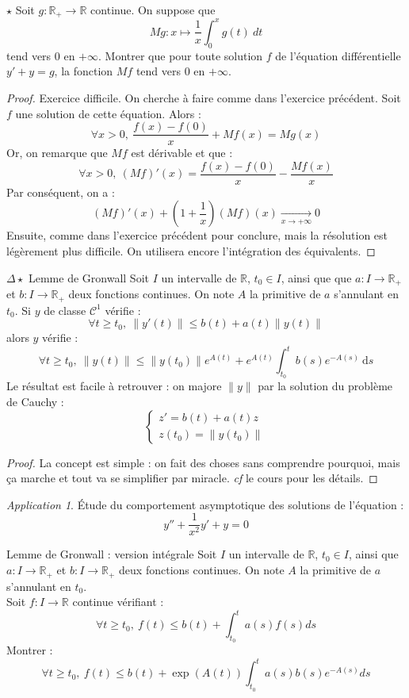 \documentclass[french,a4paper]{article}
\newcommand{\R}{\mathbb{R}}
\theoremstyle{plain}
\theoremstyle{definition}
\theoremstyle{remark}
\newtheorem*{app}{Application}
\begin{document}
\begin{ex}[Moulin.ED.31]{$\star$}
	Soit $g:\R_+\to\R$ continue. On suppose que $$Mg:x\mapsto\frac{1}{x}\int_{0}^{x}g(t)\ dt$$ tend vers $0$ en $+\infty$. Montrer que pour toute solution $f$ de l'équation différentielle $y'+y=g$, la fonction $Mf$ tend vers $0$ en $+\infty$.
\end{ex}
\begin{proof}
	Exercice difficile. On cherche à faire comme dans l'exercice précédent. Soit $f$ une solution de cette équation. Alors : $$\forall x>0,\ \frac{f(x)-f(0)}{x}+Mf(x)=Mg(x)$$ Or, on remarque que $Mf$ est dérivable et que : $$\forall x>0,\ (Mf)'(x)=\frac{f(x)-f(0)}{x}-\frac{Mf(x)}{x}$$ Par conséquent, on a : $$(Mf)'(x)+\left(1+\frac{1}{x}\right)(Mf)(x)\xrightarrow[x\to+\infty]{}0$$ Ensuite, comme dans l'exercice précédent pour conclure, mais la résolution est légèrement plus difficile. On utilisera encore l'intégration des équivalents.
\end{proof}

\begin{ex}{$\Delta\star$ Lemme de Gronwall}
	Soit $I$ un intervalle de $\R$, $t_0\in I$, ainsi que que $a:I\to\R_+$ et $b:I\to\R_+$ deux fonctions continues. On note $A$ la primitive de $a$ s'annulant en $t_0$. Si $y$ de classe $\mathcal{C}^1$ vérifie : $$\forall t\geqslant t_0,\ \lVert y'(t)\rVert\leqslant b(t)+a(t)\lVert y(t)\rVert$$ alors $y$ vérifie : $$\forall t\geqslant t_0,\ \lVert y(t)\rVert\leqslant\lVert y(t_0)\rVert e^{A(t)}+e^{A(t)}\int_{t_0}^{t}b(s)e^{-A(s)}\ \text{d} s$$ Le résultat est facile à retrouver : on majore $\lVert y\rVert$ par la solution du problème de Cauchy : $$\begin{cases}
		z'=b(t)+a(t)z \\
		z(t_0)=\lVert y(t_0)\rVert
	\end{cases}$$
\end{ex}
\begin{proof}
	La concept est simple : on fait des choses sans comprendre pourquoi, mais ça marche et tout va se simplifier par miracle. \textit{cf} le cours pour les détails.
\end{proof}
\begin{app}
	Étude du comportement asymptotique des solutions de l'équation : $$y''+\frac{1}{x^2}y'+y=0$$
\end{app}

\begin{ex}[Moulin.ED.41]{Lemme de Gronwall : version intégrale}
	Soit $I$ un intervalle de $\R$, $t_0\in I$, ainsi que $a:I\to\R_+$ et $b:I\to\R_+$ deux fonctions continues. On note $A$ la primitive de $a$ s'annulant en $t_0$. \\
	Soit $f:I\to\R$ continue vérifiant : $$\forall t\geqslant t_0,\ f(t)\leqslant b(t)+\int_{t_0}^{t}a(s)f(s)ds$$ Montrer : $$\forall t\geqslant t_0,\ f(t)\leqslant b(t)+\exp(A(t))\int_{t_0}^{t}a(s)b(s)e^{-A(s)}ds$$
\end{ex}
\end{document}
